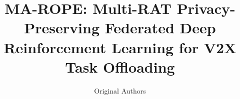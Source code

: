 \documentclass[journal,10pt,twocolumn]{IEEEtran}
\begin{document}
\title{MA-ROPE: Multi-RAT Privacy-Preserving Federated Deep Reinforcement Learning for V2X Task Offloading}
\author{Original Authors}
\maketitle










\end{document}
